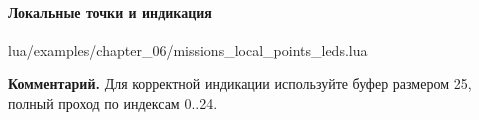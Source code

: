\paragraph{Локальные точки и индикация}
\begin{codefile}{lua/examples/chapter_06/missions_local_points_leds.lua}
\end{codefile}
\textbf{Комментарий.} Для корректной индикации используйте буфер размером 25, полный проход по индексам 0..24.
